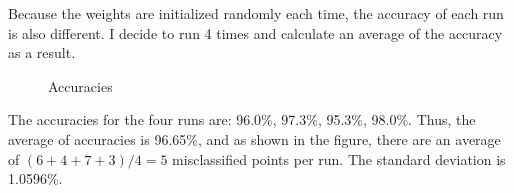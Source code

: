 \documentclass{article}
\begin{document}
\noindent
Because the weights are initialized randomly each time, the accuracy of each run is also different. I decide to run 4 times and calculate an average of the accuracy as a result.
\begin{figure}[htbp]
\centering
{}
\quad
{}
\quad
{}
\quad
{}
\caption{Accuracies}
\end{figure}
\noindent
The accuracies for the four runs are: 96.0\%, 97.3\%, 95.3\%, 98.0\%. Thus, the average of accuracies is 96.65\%, and as shown in the figure, there are an average of $(6+4+7+3) / 4 = 5$ misclassified points per run. The standard deviation is 1.0596\%.
\end{document}
